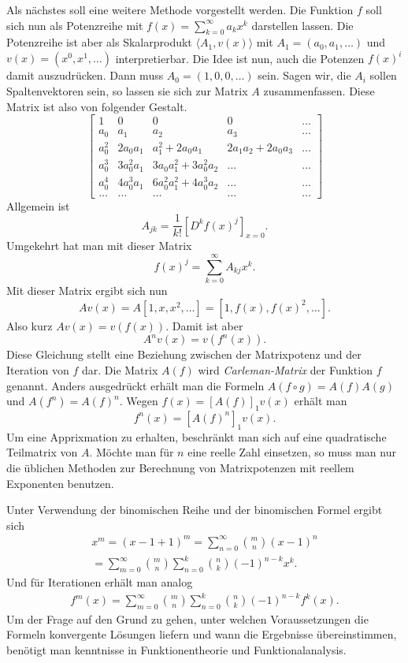 \documentclass[a4paper,10pt,fleqn,twocolumn,twoside]{article}
\begin{document}
Als nächstes soll eine weitere Methode vorgestellt werden. Die
Funktion \(f\) soll sich nun als Potenzreihe mit
\(f(x)=\sum_{k=0}^\infty a_kx^k\) darstellen lassen. Die Potenzreihe
ist aber als Skalarprodukt \(\langle A_1,v(x)\rangle\) mit
\(A_1=(a_0,a_1,\ldots)\) und \(v(x)=(x^0,x^1,\ldots)\)
interpretierbar. Die Idee ist nun, auch die Potenzen \(f(x)^i\) damit
auszudrücken. Dann muss \(A_0=(1,0,0,\ldots)\) sein. Sagen wir, die
\(A_i\) sollen Spaltenvektoren sein, so lassen sie sich zur Matrix
\(A\) zusammenfassen. Diese Matrix ist also von folgender Gestalt.
\[\begin{bmatrix}
1 & 0 & 0 & 0 & \ldots\\
a_0 & a_1 & a_2 & a_3 & \ldots\\
a_0^2 & 2a_0a_1 & a_1^2+2a_0a_1 & 2a_1a_2+2a_0a_3 &\ldots\\
a_0^3 & 3a_0^2a_1 & 3a_0a_1^2+3a_0^2a_2 &\ldots &\ldots\\
a_0^4 & 4a_0^3a_1 & 6a_0^2a_1^2+4a_0^3a_2 & \ldots & \ldots\\
\ldots &\ldots &\ldots &\ldots & \ldots
\end{bmatrix}\]
Allgemein ist
\[A_{jk} = \frac{1}{k!}[D^k f(x)^j]_{x=0}.\]
Umgekehrt hat man mit dieser Matrix
\[f(x)^j = \sum_{k=0}^\infty A_{kj} x^k.\]
Mit dieser Matrix ergibt sich nun
\[Av(x) = A[1,x,x^2,\ldots] = [1,f(x),f(x)^2,\ldots].\]
Also kurz \(Av(x)=v(f(x))\). Damit ist aber
\[A^n v(x) = v(f^n(x)).\]
Diese Gleichung stellt eine Beziehung zwischen der Matrixpotenz und
der Iteration von \(f\) dar. Die Matrix \(A(f)\) wird
\textit{Carleman-Matrix}
der Funktion \(f\) genannt. Anders ausgedrückt erhält man die Formeln
\(A(f\circ g) = A(f)A(g)\) und \(A(f^n)=A(f)^n\).
Wegen \(f(x)=[A(f)]_1v(x)\) erhält man
\[f^n(x) = [A(f)^n]_1v(x).\]
Um eine Apprixmation zu erhalten, beschränkt man sich auf eine
quadratische Teilmatrix von \(A\). Möchte man für \(n\) eine reelle
Zahl einsetzen, so muss man nur die üblichen Methoden zur Berechnung
von Matrixpotenzen mit reellem Exponenten benutzen.

Unter Verwendung der binomischen Reihe und der binomischen Formel
ergibt sich
\begin{gather*}
x^m = (x-1+1)^m = \sum_{n=0}^\infty \binom{m}{n}(x-1)^n\\
= \sum_{m=0}^\infty \binom{m}{n}\sum_{n=0}^k\binom{n}{k}(-1)^{n-k}x^k.
\end{gather*}
Und für Iterationen erhält man analog
\begin{gather*}
f^m(x) = \sum_{m=0}^\infty \binom{m}{n}
\sum_{n=0}^k\binom{n}{k}(-1)^{n-k}f^k(x).
\end{gather*}
Um der Frage auf den Grund zu gehen, unter welchen Voraussetzungen
die Formeln konvergente Lösungen liefern und wann die Ergebnisse
übereinstimmen, benötigt man kenntnisse in Funktionentheorie
und Funktionalanalysis.
\end{document}
